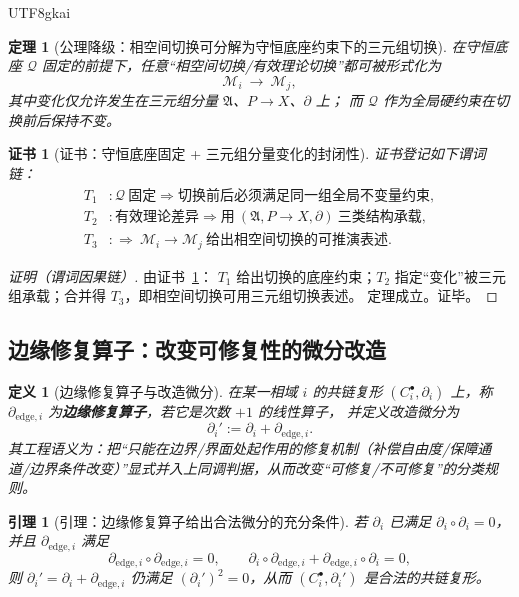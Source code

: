 \documentclass[12pt]{article}
\newtheorem{definition}{定义}[section]
\newtheorem{theorem}{定理}[section]
\newtheorem{lemma}{引理}[section]
\newtheorem{Certificate}{证书}[section]
\newcommand{\Bundle}{\ensuremath{P}}
\begin{document}
\begin{CJK*}{UTF8}{gkai}
\begin{theorem}[公理降级：相空间切换可分解为守恒底座约束下的三元组切换]
\label{thm:phase-switching-as-model-triple-switching}
在守恒底座 $\mathcal{Q}$ 固定的前提下，任意“相空间切换/有效理论切换”都可被形式化为
\[
  \mathcal{M}_i \ \longrightarrow\ \mathcal{M}_j,
\]
其中变化仅允许发生在三元组分量 $\mathfrak{A}$、$\Bundle\to X$、$\partial$ 上；
而 $\mathcal{Q}$ 作为全局硬约束在切换前后保持不变。
\end{theorem}

\begin{Certificate}[证书：守恒底座固定 + 三元组分量变化的封闭性]
\label{cert:phase-switching-as-model-triple-switching}
证书登记如下谓词链：
\[
\begin{aligned}
  T_1 &: \mathcal{Q}\ \text{固定}\Rightarrow \text{切换前后必须满足同一组全局不变量约束},\\
  T_2 &: \text{有效理论差异}\Rightarrow \text{用}\ (\mathfrak{A},\Bundle\to X,\partial)\ \text{三类结构承载},\\
  T_3 &: \Rightarrow\ \mathcal{M}_i\to\mathcal{M}_j\ \text{给出相空间切换的可推演表述}.
\end{aligned}
\]
\end{Certificate}

\begin{proof}[证明（谓词因果链）]
由证书~\ref{cert:phase-switching-as-model-triple-switching}：
$T_1$ 给出切换的底座约束；$T_2$ 指定“变化”被三元组承载；合并得 $T_3$，即相空间切换可用三元组切换表述。
定理成立。证毕。
\end{proof}

\subsection{边缘修复算子：改变可修复性的微分改造}
\label{sec:edge-repair-operator}

\begin{definition}[边缘修复算子与改造微分]
在某一相域 $i$ 的共链复形 $(C_i^\bullet,\partial_i)$ 上，称 $\partial_{\mathrm{edge},i}$ 为\textbf{边缘修复算子}，若它是次数 $+1$ 的线性算子，
并定义改造微分为
\[
  \partial_i' := \partial_i + \partial_{\mathrm{edge},i}.
\]
其工程语义为：把“只能在边界/界面处起作用的修复机制（补偿自由度/保障通道/边界条件改变）”显式并入上同调判据，从而改变“可修复/不可修复”的分类规则。
\end{definition}

\begin{lemma}[引理：边缘修复算子给出合法微分的充分条件]
\label{lem:edge-repair-yields-valid-differential}
若 $\partial_i$ 已满足 $\partial_i\circ \partial_i=0$，并且 $\partial_{\mathrm{edge},i}$ 满足
\[
  \partial_{\mathrm{edge},i}\circ\partial_{\mathrm{edge},i}=0,\qquad
  \partial_i\circ\partial_{\mathrm{edge},i} + \partial_{\mathrm{edge},i}\circ\partial_i=0,
\]
则 $\partial_i'=\partial_i+\partial_{\mathrm{edge},i}$ 仍满足 $(\partial_i')^2=0$，从而 $(C_i^\bullet,\partial_i')$ 是合法的共链复形。
\end{lemma}


\end{CJK*}
\end{document}

